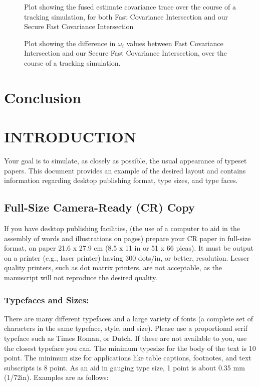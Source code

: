 \documentclass[letterpaper, 10 pt, conference]{ieeeconf}  %
\begin{document}
\begin{figure}[h]
   \centering
   \caption{Plot showing the fused estimate covariance trace over the course of a tracking simulation, for both Fast Covariance Intersection and our Secure Fast Covariance Intersection}
\end{figure}

\begin{figure}[h]
   \centering
   \caption{Plot showing the difference in $\omega_i$ values between Fast Covariance Intersection and our Secure Fast Covariance Intersection, over the course of a tracking simulation.}
\end{figure}

\section{Conclusion}




\vspace{2cm}
\section{INTRODUCTION}

Your goal is to simulate, as closely as possible, the usual appearance of typeset
 papers. This document provides an example of the desired layout and contains
 information regarding desktop publishing format, type sizes, and type faces.

\subsection{Full-Size Camera-Ready (CR) Copy}

If you have desktop publishing facilities, (the use of a computer to aid
 in the assembly of words and illustrations on pages) prepare your CR paper
  in full-size format, on paper 21.6 x 27.9 cm (8.5 x 11 in or 51 x 66 picas).
  It must be output on a printer (e.g., laser printer) having 300 dots/in, or
  better, resolution. Lesser quality printers, such as dot matrix printers,
   are not acceptable, as the manuscript will not reproduce the desired quality.

\subsubsection{Typefaces and Sizes:} There are many different typefaces and a large
variety of fonts (a complete set of characters in the same typeface, style,
 and size). Please use a proportional serif typeface such as Times Roman,
 or Dutch. If these are not available to you, use the closest typeface you
  can. The minimum typesize for the body of the text is 10 point. The minimum
  size for applications like table captions, footnotes, and text subscripts
  is 8 point. As an aid in gauging type size, 1 point is about 0.35 mm (1/72in).
   Examples are as follows:
\end{document}
